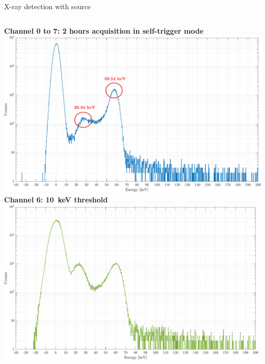 \documentclass[aspectratio=169,xcolor=dvipsnames,handout]{beamer} %
\begin{document}

\begin{frame}{X-ray detection with  source}
    \addtolength{\leftmargini}{\labelsep}
    \fontsize{9pt}{1}\selectfont
    \vspace{0.1cm}
    \begin{columns}
            \centering
            \textbf{\hspace{0.7cm}Channel 0 to 7: 2 hours acquisition in self-trigger mode}
            \vskip0.1cm
            \includegraphics[width=1.06\textwidth]{images/muon_detection/americium/ch4_americio_log.pdf}
            \centering
            \fontsize{8.5pt}{1}\selectfont
            \textbf{Channel 6: \SI{10}{\kilo\electronvolt} threshold}
            \vskip0.1cm
            \includegraphics[width=0.99\textwidth]{images/muon_detection/americium/ch4_americio_log_ch6.pdf}

\end{columns}
\end{frame}
\end{document}
